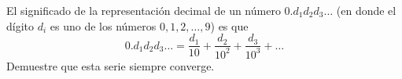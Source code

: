 \item El significado de la representación decimal de un número $0.d_1 d_2 d_3 \dots$ (en donde el dígito $d_i$ es uno de los números $0, 1, 2, \dots, 9$) es que
    \[ 0.d_1 d_2 d_3 \dots = \frac{d_1}{10} + \frac{d_2}{10^2} + \frac{d_3}{10^3} + \dots \]
    Demuestre que esta serie siempre converge.
